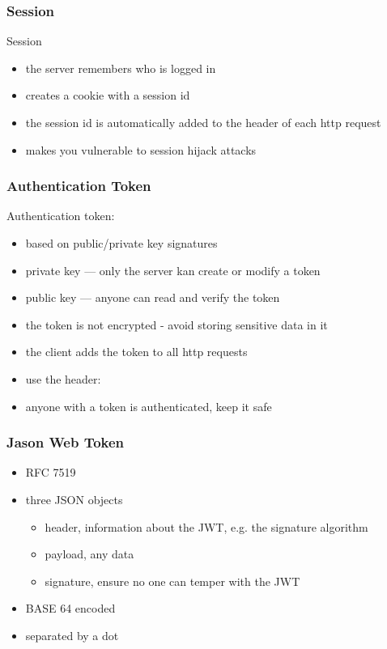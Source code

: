 \begin{frame}[fragile] \frametitle{Session}
Session
\begin{itemize}
  \item the server remembers who is logged in
  \item creates a cookie with a session id
  \item the session id is automatically added to the header of each http request
  \item makes you vulnerable to session hijack attacks
\end{itemize}
\vspace{5mm}
\end{frame}

\begin{frame}[fragile] \frametitle{Authentication Token}
Authentication token:
\begin{itemize}
  \item based on public/private key signatures
  \item private key --- only the server kan create or modify a token
  \item public key --- anyone can read and verify the token
  \item the token is not encrypted - avoid storing sensitive data in it
  \item the client adds the token to all http requests
  \item use the header: 
  \item anyone with a token is authenticated, keep it safe
\end{itemize}
\end{frame}

\begin{frame}[fragile] \frametitle{Jason Web Token}
\begin{itemize}
  \item RFC 7519
  \item three JSON objects
  \begin{itemize}
    \item header, information about the JWT, e.g. the signature algorithm
    \item payload, any data
    \item signature, ensure no one can temper with the JWT
  \end{itemize}
  \item BASE 64 encoded
  \item separated by a dot
\end{itemize}
\end{frame}


